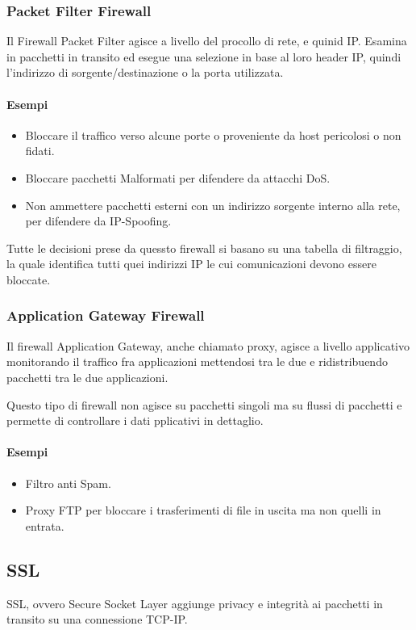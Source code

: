 \documentclass[12pt, a4paper, openany]{book}
\begin{document}
\subsubsection*{Packet Filter Firewall}
Il Firewall Packet Filter agisce a livello del procollo di rete, e quinid IP.
Esamina in pacchetti in transito ed esegue una selezione in base al loro header IP, quindi l'indirizzo di sorgente/destinazione o la porta utilizzata.

\paragraph*{Esempi}
\begin{itemize}
    \item Bloccare il traffico verso alcune porte o proveniente da host pericolosi o non fidati.
    \item Bloccare pacchetti Malformati per difendere da attacchi DoS.
    \item Non ammettere pacchetti esterni con un indirizzo sorgente interno alla rete, per difendere da IP-Spoofing. 
\end{itemize}

Tutte le decisioni prese da quessto firewall si basano su una tabella di filtraggio, la quale identifica tutti quei indirizzi IP le cui comunicazioni devono essere bloccate.

\subsubsection{Application Gateway Firewall}
Il firewall Application Gateway, anche chiamato proxy, agisce a livello applicativo
monitorando il traffico fra applicazioni mettendosi tra le due e ridistribuendo pacchetti tra le due applicazioni.

Questo tipo di firewall non agisce su pacchetti singoli ma su flussi di pacchetti e permette di controllare i dati pplicativi in dettaglio.

\paragraph*{Esempi}
\begin{itemize}
    \item Filtro anti Spam.
    \item Proxy FTP per bloccare i trasferimenti di file in uscita ma non quelli in entrata.
\end{itemize}

\subsection{SSL}
SSL, ovvero Secure Socket Layer aggiunge privacy e integrità ai pacchetti in transito su una connessione TCP-IP.
\end{document}

